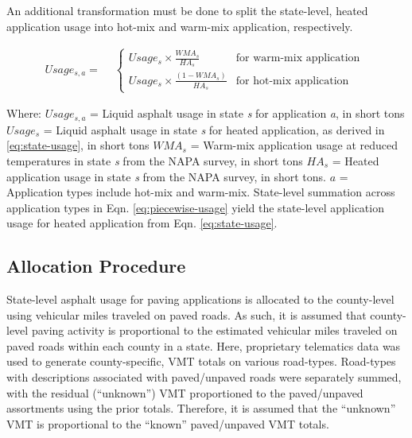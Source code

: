 \documentclass[
  11pt,
  oneside]{book}
\begin{document}
An additional transformation must be done to split the state-level, heated application usage into hot-mix and warm-mix application, respectively.

\begin{equation} 
  Usage_{s,a} = 
  \begin{aligned}
  &\begin{cases} 
    Usage_{s} \times \frac{WMA_{s}}{HA_{s}} & \text{for warm-mix application}\\ 
    Usage_{s} \times \frac{(1 - WMA_{s})}{HA_{s}} & \text{for hot-mix application }
  \end{cases}
  \end{aligned}
  \label{eq:piecewise-usage}
\end{equation}

Where: \newline
\(Usage_{s,a}\) = Liquid asphalt usage in state \emph{s} for application \emph{a}, in short tons \newline
\(Usage_{s}\) = Liquid asphalt usage in state \emph{s} for heated application, as derived in \eqref{eq:state-usage}, in short tons \newline
\(WMA_{s}\) = Warm-mix application usage at reduced temperatures in state \emph{s} from the NAPA survey, in short tons \newline
\(HA_{s}\) = Heated application usage in state \emph{s} from the NAPA survey, in short tons. \newline
\(a\) = Application types include hot-mix and warm-mix. State-level summation across application types in Eqn. \eqref{eq:piecewise-usage} yield the state-level application usage for heated application from Eqn. \eqref{eq:state-usage}. \newline

\subsection{Allocation Procedure}\label{allocation-procedure-1}

State-level asphalt usage for paving applications is allocated to the county-level using vehicular miles traveled on paved roads. As such, it is assumed that county-level paving activity is proportional to the estimated vehicular miles traveled on paved roads within each county in a state. Here, proprietary telematics data was used to generate county-specific, VMT totals on various road-types. Road-types with descriptions associated with paved/unpaved roads were separately summed, with the residual (``unknown'') VMT proportioned to the paved/unpaved assortments using the prior totals. Therefore, it is assumed that the ``unknown'' VMT is proportional to the ``known'' paved/unpaved VMT totals.
\end{document}
